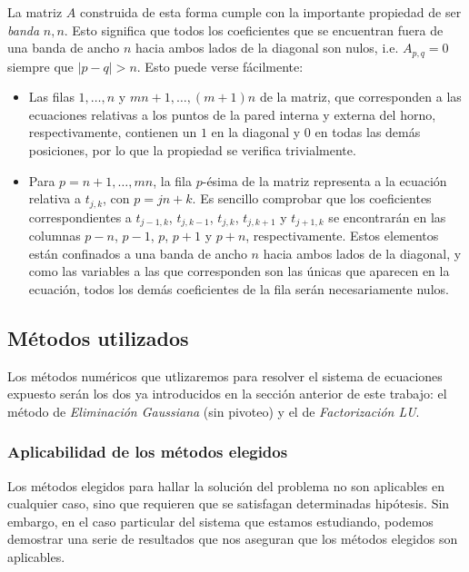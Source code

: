     La matriz $A$ construida de esta forma cumple con la importante propiedad de ser \emph{banda} $n, n$. Esto significa que todos los coeficientes que se encuentran fuera de una banda de ancho $n$ hacia ambos lados de la diagonal son nulos, i.e. $A_{p,q} = 0$ siempre que $\vert p - q \vert > n$. Esto puede verse fácilmente:

    \begin{itemize}
      \item Las filas $1, \dots, n$ y $mn + 1, \dots, (m+1)n$ de la matriz, que corresponden a las ecuaciones relativas a los puntos de la pared interna y externa del horno, respectivamente, contienen un $1$ en la diagonal y $0$ en todas las demás posiciones, por lo que la propiedad se verifica trivialmente.
      \item Para $p = n + 1, \dots, mn$, la fila $p$-ésima de la matriz representa a la ecuación relativa a $t_{j,k}$, con $p = jn+k$. Es sencillo comprobar que los coeficientes correspondientes a $t_{j-1,k}$, $t_{j,k-1}$, $t_{j,k}$, $t_{j,k+1}$ y $t_{j+1,k}$ se encontrarán en las columnas $p-n$, $p-1$, $p$, $p+1$ y $p+n$, respectivamente. Estos elementos están confinados a una banda de ancho $n$ hacia ambos lados de la diagonal, y como las variables a las que corresponden son las únicas que aparecen en la ecuación, todos los demás coeficientes de la fila serán necesariamente nulos.
    \end{itemize}

  \subsection{Métodos utilizados}

    Los métodos numéricos que utlizaremos para resolver el sistema de ecuaciones expuesto serán los dos ya introducidos en la sección anterior de este trabajo: el método de \emph{Eliminación Gaussiana} (sin pivoteo) y el de \emph{Factorización LU}.

    \subsubsection{Aplicabilidad de los métodos elegidos}
       Los métodos elegidos para hallar la solución del problema no son aplicables en cualquier caso, sino que requieren que se satisfagan determinadas hipótesis. Sin embargo, en el caso particular del sistema que estamos estudiando, podemos demostrar una serie de resultados que nos aseguran que los métodos elegidos son aplicables.

